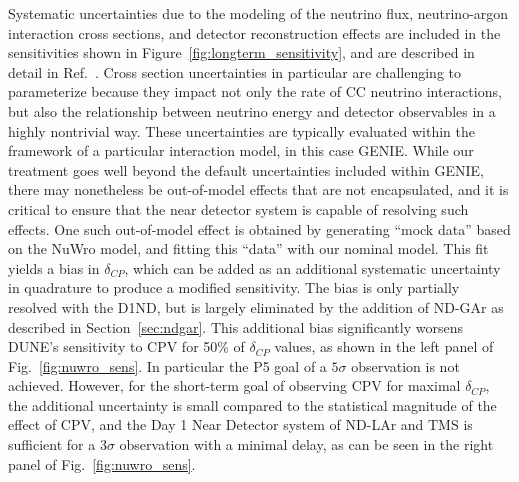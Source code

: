 \documentclass[11pt]{article}
\begin{document}
Systematic uncertainties due to the modeling of the neutrino flux, neutrino-argon interaction cross sections, and detector reconstruction effects are included in the sensitivities shown in Figure~\ref{fig:longterm_sensitivity}, and are described in detail in Ref.~\cite{lblpaper}. Cross section uncertainties in particular are challenging to parameterize because they impact not only the rate of CC neutrino interactions, but also the relationship between neutrino energy and detector observables in a highly nontrivial way. These uncertainties are typically evaluated within the framework of a particular interaction model, in this case GENIE. While our treatment goes well beyond the default uncertainties included within GENIE, there may nonetheless be out-of-model effects that are not encapsulated, and it is critical to ensure that the near detector system is capable of resolving such effects. One such out-of-model effect is obtained by generating ``mock data'' based on the NuWro model, and fitting this ``data'' with our nominal model. This fit yields a bias in $\delta_{CP}$, which can be added as an additional systematic uncertainty in quadrature to produce a modified sensitivity. The bias is only partially resolved with the D1ND, but is largely eliminated by the addition of ND-GAr as described in Section~\ref{sec:ndgar}. This additional bias significantly worsens DUNE's sensitivity to CPV for 50\% of $\delta_{CP}$ values, as shown in the left panel of Fig.~\ref{fig:nuwro_sens}. In particular the P5 goal of a $5 \sigma$ observation is not achieved. However, for the short-term goal of observing CPV for maximal $\delta_{CP}$, the additional uncertainty is small compared to the statistical magnitude of the effect of CPV, and the Day 1 Near Detector system of ND-LAr and TMS is sufficient for a $3 \sigma$ observation with a minimal delay, as can be seen in the right panel of Fig.~\ref{fig:nuwro_sens}.
\end{document}
